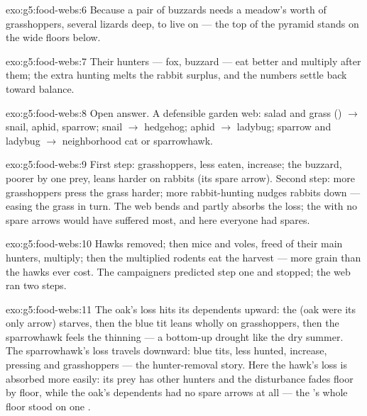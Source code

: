 \begin{solution}{exo:g5:food-webs:6}
Because a pair of buzzards needs a meadow's worth of
grasshoppers, several lizards deep, to live on --- the top of
the pyramid stands on the wide floors below.
\end{solution}

\begin{solution}{exo:g5:food-webs:7}
Their hunters --- fox, buzzard --- eat better and multiply
after them; the extra hunting melts the rabbit surplus, and
the numbers settle back toward balance.
\end{solution}

\begin{solution}{exo:g5:food-webs:8}
Open answer. A defensible garden web: salad and grass
() $\rightarrow$ snail, aphid, sparrow;
snail $\rightarrow$ hedgehog; aphid $\rightarrow$ ladybug;
sparrow and ladybug $\rightarrow$ neighborhood cat or
sparrowhawk.
\end{solution}

\begin{solution}{exo:g5:food-webs:9}
First step: grasshoppers, less eaten, increase; the buzzard,
poorer by one prey, leans harder on rabbits (its spare
arrow). Second step: more grasshoppers press the grass
harder; more rabbit-hunting nudges rabbits down --- easing
the grass in turn. The web bends and partly absorbs the
loss; the  with no spare arrows would have suffered
most, and here everyone had spares.
\end{solution}

\begin{solution}{exo:g5:food-webs:10}
Hawks removed; then mice and voles, freed of their main
hunters, multiply; then the multiplied rodents eat the
harvest --- more grain than the hawks ever cost. The
campaigners predicted step one and stopped; the web ran two
steps.
\end{solution}

\begin{solution}{exo:g5:food-webs:11}
The oak's loss hits its dependents upward: the 
(oak  were its only arrow) starves, then the blue tit
leans wholly on grasshoppers, then the sparrowhawk feels
the thinning --- a bottom-up drought like the dry summer.
The sparrowhawk's loss travels downward: blue tits, less
hunted, increase, pressing  and grasshoppers
--- the hunter-removal story. Here the hawk's loss is
absorbed more easily: its prey has other hunters and the
disturbance fades floor by floor, while the oak's
dependents had no spare arrows at all --- the 's
whole floor stood on one .
\end{solution}
